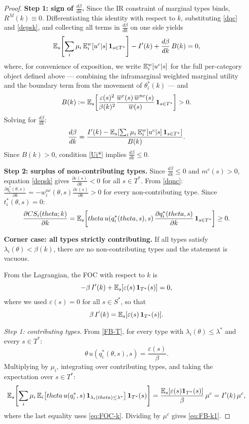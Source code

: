 \documentclass[master.tex]{subfiles}
\begin{document}
\begin{proof}
\noindent\textbf{Step 1: sign of $\frac{d\beta}{dk}$.} Since the IR constraint of marginal types binds, $R^M(k)\equiv 0$. Differentiating this identity with respect to $k$, substituting \eqref{dqc} and \eqref{depsk}, and collecting all terms in $\frac{d\beta}{dk}$ on one side yields
\[
\mathbb{E}_s\!\left[\sum_i\mu_i\,\mathbb{E}^w_i[u^c|s]\,\mathbf{1}_{s\in T^*}\right] - I'(k) + \frac{d\beta}{dk}\,B(k) = 0,
\]
where, for convenience of exposition, we write $\mathbb{E}^w_i[u^c|s]$ for the full per-category object defined above --- combining the inframarginal weighted marginal utility and the boundary term from the movement of $\theta_i^*(k)$ --- and
\[
B(k) := \mathbb{E}_s\!\left[\frac{\varepsilon(s)^2}{\beta(k)^2}\frac{\overline w^c(s)\,\overline w^{nc}(s)}{\overline w(s)}\,\mathbf{1}_{s\in T^*}\right] > 0.
\]
Solving for $\frac{d\beta}{dk}$:
\[
\frac{d\beta}{dk} = \frac{I'(k) - \mathbb{E}_s\!\left[\sum_i\mu_i\,\mathbb{E}^w_i[u^c|s]\,\mathbf{1}_{s\in T^*}\right]}{B(k)}.
\]
Since $B(k)>0$, condition \eqref{Ui*} implies $\frac{d\beta}{dk}\leq 0$.

\noindent\textbf{Step 2: surplus of non-contributing types.} Since $\frac{d\beta}{dk}\leq 0$ and $m^c(s)>0$, equation \eqref{depsk} gives $\frac{\partial\varepsilon(s)}{\partial k}<0$ for all $s\in T^*$. From \eqref{dqnc}: $\frac{\partial q_i^*(\theta,s)}{\partial k} = -w_i^{nc}(\theta,s)\frac{\partial\varepsilon(s)}{\partial k} > 0$ for every non-contributing type. Since $t_i^*(\theta,s)=0$:
\[
\frac{\partial CS_i(theta;k)}{\partial k} = \mathbb{E}_s\!\left[theta\,u(q_i^*(theta,s),s)\,\frac{\partial q_i^*(theta,s)}{\partial k}\,\mathbf{1}_{s\in T^*}\right] \geq 0.
\]

\noindent\textbf{Corner case: all types strictly contributing.} If all types satisfy $\lambda_i(\theta)<\beta(k)$, there are no non-contributing types and the statement is vacuous.


From the Lagrangian, the FOC with respect to $k$ is
\[
-\beta\, I'(k) + \mathbb{E}_s[\varepsilon(s)\,\mathbf{1}_{T^*}(s)] = 0,
\]
where we used $\varepsilon(s)=0$ for all $s\in S^*$, so that
\begin{equation}\label{eq:FOC-k}
\beta\, I'(k) = \mathbb{E}_s[\varepsilon(s)\,\mathbf{1}_{T^*}(s)].
\end{equation}

\textit{Step 1: contributing types.} From \eqref{FB-T}, for every type with $\lambda_i(\theta)\leq\lambda^*$ and every $s\in T^*$:
\[
\theta\, u(q_i^*(\theta,s),s) = \frac{\varepsilon(s)}{\beta}.
\]
Multiplying by $\mu_i$, integrating over contributing types, and taking the expectation over $s\in T^*$:
\begin{equation}\label{eq:step1}
\mathbb{E}_s\!\left[\sum_i \mu_i\,\mathbb{E}_i\!\left[theta\, u(q_i^*,s)\,\mathbf{1}_{\lambda_i(theta)\leq\lambda^*}\right]\mathbf{1}_{T^*}(s)\right] = \frac{\mathbb{E}_s[\varepsilon(s)\mathbf{1}_{T^*}(s)]}{\beta}\,\mu^c = I'(k)\,\mu^c,
\end{equation}
where the last equality uses \eqref{eq:FOC-k}. Dividing by $\mu^c$ gives \eqref{eq:FB-k1}.

\end{proof}
\end{document}
